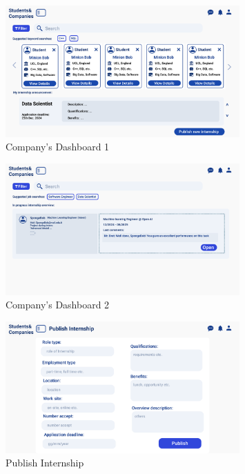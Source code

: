 \begin{figure}[H]
    \centering
    \includegraphics[width=0.8\textwidth]{Images/UI/Dashboard 1-company.png}
    \caption{Company's Dashboard 1}\label{fig:DashboardCompany1}
\end{figure}

\begin{figure}[H]
    \centering
    \includegraphics[width=0.8\textwidth]{Images/UI/Dashboard 2-company.png}
    \caption{Company's Dashboard 2}\label{fig:DashboardCompany2}
\end{figure}

\begin{figure}[H]
    \centering
    \includegraphics[width=0.8\textwidth]{Images/UI/Publish Internship -company.png}
    \caption{Publish Internship}\label{fig:Publish Internship}
\end{figure}

